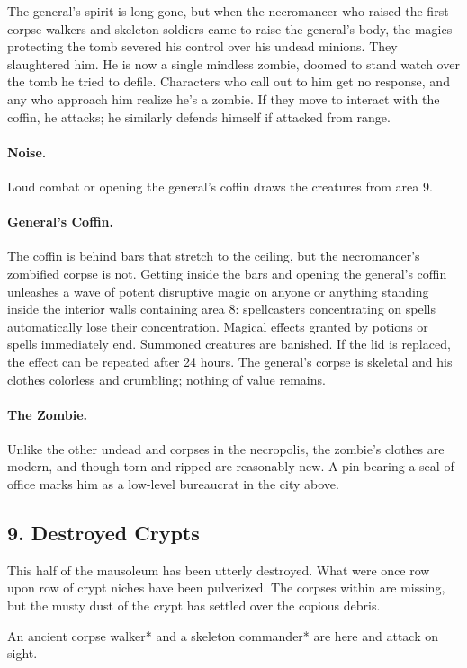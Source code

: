 \documentclass[10pt,a4paper,twoside,twocolumn,openany,bg=print,nodeprecatedcode]{dndbook}
\begin{document}
The general's spirit is long gone, but when the necromancer who raised the first corpse walkers and skeleton soldiers came to raise the general's body, the magics protecting the tomb severed his control over his undead minions. They slaughtered him. He is now a single mindless zombie, doomed to stand watch over the tomb he tried to defile. Characters who call out to him get no response, and any who approach him realize he's a zombie. If they move to interact with the coffin, he attacks; he similarly defends himself if attacked from range.
\paragraph{Noise.}
Loud combat or opening the general's coffin draws the creatures from area 9.
\paragraph{General's Coffin.}
The coffin is behind bars that stretch to the ceiling, but the necromancer's zombified corpse is not. Getting inside the bars and opening the general's coffin unleashes a wave of potent disruptive magic on anyone or anything standing inside the interior walls containing area 8: spellcasters concentrating on spells automatically lose their concentration. Magical effects granted by potions or spells immediately end. Summoned creatures are banished. If the lid is replaced, the effect can be repeated after 24 hours. The general's corpse is skeletal and his clothes colorless and crumbling; nothing of value remains.
\paragraph{The Zombie.}
Unlike the other undead and corpses in the necropolis, the zombie's clothes are modern, and though torn and ripped are reasonably new. A pin bearing a seal of office marks him as a low-level bureaucrat in the city above.
\subsection{9. Destroyed Crypts}
\begin{DndReadAloud}{}
This half of the mausoleum has been utterly destroyed. What were once row upon row of crypt niches have been pulverized. The corpses within are missing, but the musty dust of the crypt has settled over the copious debris.
\end{DndReadAloud}

An ancient corpse walker* and a skeleton commander* are here and attack on sight.
\end{document}
